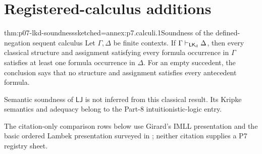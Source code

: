 
\section{Registered-calculus additions}

\begin{hbtheorem}{thm:p07-lkd-soundness}{sketched=annex:p7.calculi.1}{Soundness of the defined-negation sequent calculus}
Let \(\Gamma,\Delta\) be finite contexts.  If
\(\Gamma\vdash_{\mathsf{LK}_{\mathrm d}}\Delta\), then every
classical structure and assignment satisfying every formula occurrence in
\(\Gamma\) satisfies at least one formula occurrence in \(\Delta\).  For an
empty succedent, the conclusion says that no structure and assignment
satisfies every antecedent formula.
\end{hbtheorem}

Semantic soundness of \(\mathsf{LJ}\) is not inferred from this classical
result.  Its Kripke semantics and adequacy belong to the Part-8
intuitionistic-logic entry.

The citation-only comparison rows below use Girard's IMLL presentation
\cite{Girard1987} and the basic ordered Lambek presentation surveyed in
\cite{GalatosJipsenKowalskiOno2007}; neither citation supplies a P7 registry
sheet.

